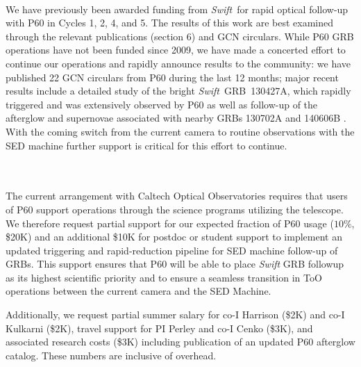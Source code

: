 \documentclass[letterpaper,11pt]{article}
\newcommand{\swift}{\textit{Swift}}
\begin{document}
\smallskip\\
We have previously been awarded funding from \swift\ for rapid optical
follow-up with P60 in Cycles 1, 2, 4, and 5.  The results of this work are best
examined through the relevant publications (section 6) and GCN circulars.  
While P60 GRB operations have not been funded since 2009, we have made a 
concerted effort to continue our operations and rapidly announce results
to the community: we have published 22 GCN circulars from P60 during the last 
12 months; 
major recent results include a detailed study of the bright 
\swift\ GRB\ 130427A, which rapidly triggered and was extensively observed by 
P60  \citep{pcc+2013} as well as follow-up of the afterglow
and supernovae associated with nearby GRBs 130702A \citep{sck+13,tcs+15} and 
140606B \citep{skc+15,cdp+15}.  
With the coming switch from the current camera to routine observations with 
the SED machine further support is critical for this effort to continue.
\\


\smallskip\\
\begin{multicols}{2}
{\footnotesize


}
\end{multicols}

\smallskip\\
The current arrangement with Caltech Optical Observatories requires that
users of P60 support operations through the science programs
utilizing the telescope. We therefore request partial support for
our expected fraction of P60 usage ($10\%$, \$20K) and an additional \$10K 
for postdoc or student support to implement an updated triggering and rapid-reduction
pipeline for SED machine follow-up of GRBs.
This support ensures
that P60 will be able to place {\em Swift} GRB followup as its
highest scientific priority and to ensure a seamless transition in ToO operations
between the current camera and the SED Machine.

Additionally, we request partial summer salary for co-I Harrison (\$2K) and
co-I Kulkarni (\$2K), travel support for PI Perley and co-I Cenko
(\$3K), and associated research costs (\$3K) including publication of an
updated P60 afterglow catalog.  These numbers are inclusive of overhead. 
\end{document}
